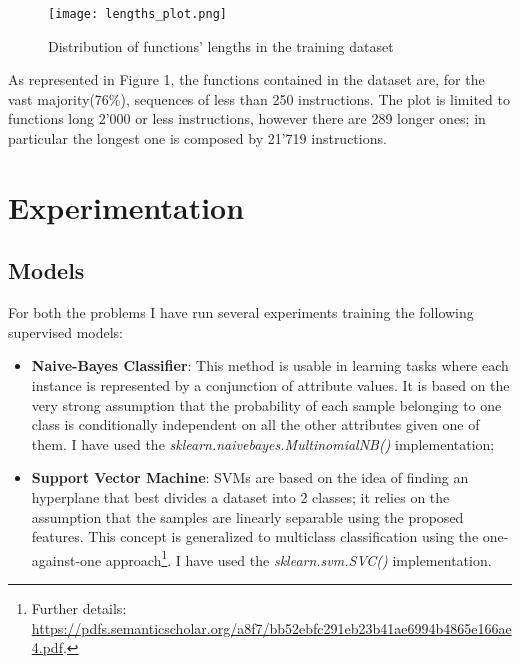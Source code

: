 \documentclass[a4paper]{article}
\begin{document}
\begin{figure} [h!]
  \texttt{[image: lengths\_plot.png]}
  \caption{Distribution of functions' lengths in the training dataset}
  \label{fig: Figure 1}
\end{figure}
As represented in Figure 1, the functions contained in the dataset are, for the vast majority(76\%), sequences of less than 250 instructions.
The plot is limited to functions long 2'000 or less instructions, however there are 289 longer ones; in particular the longest one is composed by 21'719 instructions.
\section{Experimentation}
\subsection{Models}
For both the problems I have run several experiments training the following supervised models:
\begin{itemize}
\item \textbf{Naive-Bayes Classifier}: This method is usable in learning tasks where each instance is represented by a conjunction of attribute values. It is based on the very strong assumption that the probability of each sample belonging to one class is conditionally independent on all the other attributes given one of them. I have used the \textit{sklearn.naive\textunderscore bayes.MultinomialNB()} implementation;
\item \textbf{Support Vector Machine}: SVMs are based on the idea of finding an hyperplane that best divides a dataset into 2 classes; it relies on the assumption that the samples are linearly separable using the proposed features. This concept is generalized to multiclass classification using the one-against-one approach\footnote{Further details: \href{https://pdfs.semanticscholar.org/a8f7/bb52ebfc291eb23b41ae6994b4865e166ae4.pdf}{https://pdfs.semanticscholar.org/a8f7/bb52ebfc291eb23b41ae6994b4865e166ae4.pdf}.}. I have used the \textit{sklearn.svm.SVC()} implementation.
\end{itemize}
\end{document}
